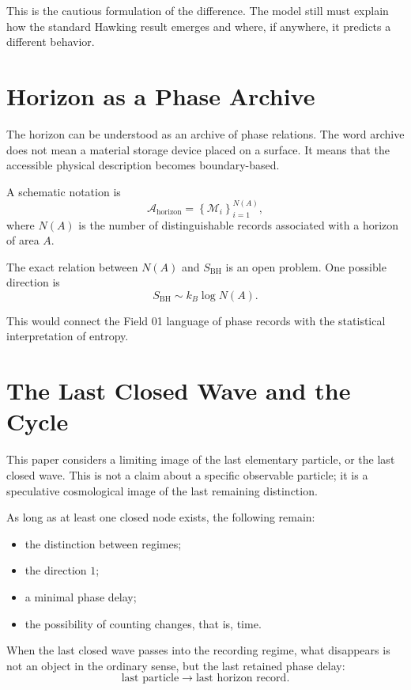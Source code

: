 \documentclass[11pt,a4paper]{article}
\newcommand{\memory}{\mathcal{M}}
\begin{document}
This is the cautious formulation of the difference. The model still must explain how the standard Hawking result emerges and where, if anywhere, it predicts a different behavior.

\section{Horizon as a Phase Archive}

The horizon can be understood as an archive of phase relations. The word archive does not mean a material storage device placed on a surface. It means that the accessible physical description becomes boundary-based.

A schematic notation is
\begin{equation}
\mathcal{A}_{\mathrm{horizon}} = \left\{ \memory_i \right\}_{i=1}^{N(A)},
\end{equation}
where $N(A)$ is the number of distinguishable records associated with a horizon of area $A$.

The exact relation between $N(A)$ and $S_{\mathrm{BH}}$ is an open problem. One possible direction is
\begin{equation}
S_{\mathrm{BH}} \sim k_B \log N(A).
\end{equation}

This would connect the Field 01 language of phase records with the statistical interpretation of entropy.

\section{The Last Closed Wave and the Cycle}

This paper considers a limiting image of the last elementary particle, or the last closed wave. This is not a claim about a specific observable particle; it is a speculative cosmological image of the last remaining distinction.

As long as at least one closed node exists, the following remain:
\begin{itemize}
\item the distinction between regimes;
\item the direction $1$;
\item a minimal phase delay;
\item the possibility of counting changes, that is, time.
\end{itemize}

When the last closed wave passes into the recording regime, what disappears is not an object in the ordinary sense, but the last retained phase delay:
\begin{equation}
\text{last particle} \longrightarrow \text{last horizon record}.
\end{equation}
\end{document}
